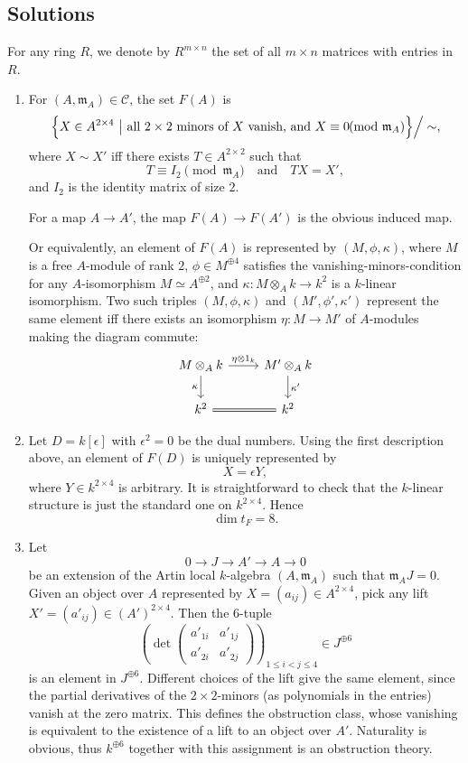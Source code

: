\subsection*{Solutions}
For any ring $R$, we denote by $R^{m\times n}$ the set of all $m\times n$ matrices with entries in $R$.
\begin{enumerate}[label=\arabic*.]
\item For $(A,\mathfrak{m}_A)\in \mathcal{C}$, the set $F(A)$ is
\[
\Bigl\{X\in A^{2\times 4}\ \big|\ \text{all }2\times 2\text{ minors of }X\text{ vanish, and }X\equiv 0\!\!\!\pmod{\mathfrak{m}_A}\Bigr\}\Big/\sim,
\]
where $X\sim X'$ iff there exists $T\in A^{2\times 2}$ such that
\[
T\equiv I_2\pmod{\mathfrak{m}_A}
\quad\text{and}\quad
TX=X',
\]
and $I_2$ is the identity matrix of size $2$.

For a map $A\to A'$, the map $F(A)\to F(A')$ is the obvious induced map.

Or equivalently, an element of $F(A)$ is represented by $(M,\phi,\kappa)$, where
$M$ is a free $A$-module of rank $2$, $\phi\in M^{\oplus 4}$ satisfies the vanishing-minors-condition
for any $A$-isomorphism $M\simeq A^{\oplus 2}$, and $\kappa:M\otimes_A k\to k^2$ is a $k$-linear isomorphism.
Two such triples $(M,\phi,\kappa)$ and $(M',\phi',\kappa')$ represent the same element iff there exists an isomorphism
$\eta:M\to M'$ of $A$-modules making the diagram commute:
\[
\begin{tikzcd}
M\otimes_A k \arrow[r,"\eta\otimes 1_k"] \arrow[d,"\kappa"'] & M'\otimes_A k \arrow[d,"\kappa'"] \\
k^2 \arrow[r,equal] & k^2
\end{tikzcd}
\]

\item Let $D=k[\epsilon]$ with $\epsilon^2=0$ be the dual numbers. Using the first description above,
an element of $F(D)$ is uniquely represented by
\[
X=\epsilon Y,
\]
where $Y\in k^{2\times 4}$ is arbitrary. It is straightforward to check that the $k$-linear structure is just the standard one on $k^{2\times 4}$.
Hence
\[
\dim t_F = 8.
\]

\item Let
\[
0\to J\to A'\to A\to 0
\]
be an extension of the Artin local $k$-algebra $(A,\mathfrak{m}_A)$ such that $\mathfrak{m}_A J=0$.
Given an object over $A$ represented by $X=(a_{ij})\in A^{2\times 4}$, pick any lift
$X'=(a'_{ij})\in (A')^{2\times 4}$. Then the $6$-tuple
\[
\left(\det
\begin{pmatrix}
a'_{1i} & a'_{1j}\\
a'_{2i} & a'_{2j}
\end{pmatrix}\right)_{1\le i<j\le 4}
\in J^{\oplus 6}
\]
is an element in $J^{\oplus 6}$. Different choices of the lift give the same element,
since the partial derivatives of the $2\times 2$-minors (as polynomials in the entries) vanish at the zero matrix.
This defines the obstruction class, whose vanishing is equivalent to the existence of a lift to an object over $A'$.
Naturality is obvious, thus $k^{\oplus 6}$ together with this assignment is an obstruction theory.


\end{enumerate}
